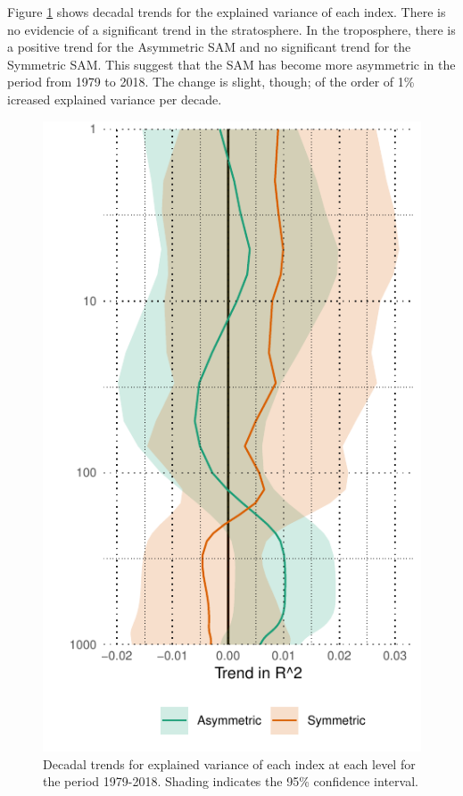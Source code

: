 \documentclass[]{ametsocV5}
\begin{document}
Figure \ref{fig:r-squared-trend} shows decadal trends for the explained
variance of each index. There is no evidencie of a significant trend in
the stratosphere. In the troposphere, there is a positive trend for the
Asymmetric SAM and no significant trend for the Symmetric SAM. This
suggest that the SAM has become more asymmetric in the period from 1979
to 2018. The change is slight, though; of the order of 1\% icreased
explained variance per decade.

\begin{figure}
\includegraphics{r-squared-trend-1} \caption[Decadal trends for explained variance of each index at each level for the period 1979-2018]{Decadal trends for explained variance of each index at each level for the period 1979-2018. Shading indicates the 95\% confidence interval.}\label{fig:r-squared-trend}
\end{figure}
\end{document}
